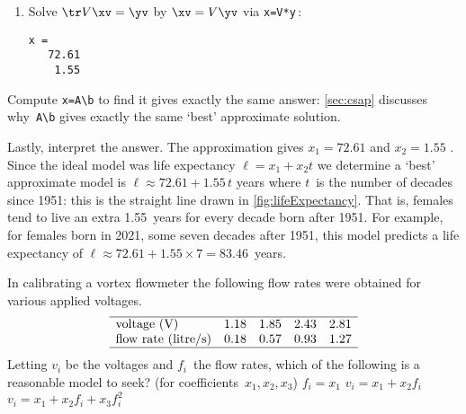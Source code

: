\begin{example}
\begin{solution}
\begin{enumerate}
\item Solve \(\tr V\xv=\yv\) by \(\xv=V\yv\) via \verb|x=V*y|\,:
\begin{verbatim}
x =
   72.61
    1.55
\end{verbatim}
\end{enumerate}
Compute \verb|x=A\b| to find it gives exactly the same answer: \cref{sec:csap} discusses why~\verb|A\b| gives exactly the same `best' approximate solution. 

Lastly, interpret the answer.
The approximation gives \(x_1=72.61\) and \(x_2=1.55\) \twodp.  
Since the ideal model was life expectancy \(\ell=x_1+x_2t\) we  determine a `best' approximate model is \(\ell\approx72.61+1.55\,t\) years where \(t\)~is the number of decades since 1951: this is the straight line drawn in \cref{fig:lifeExpectancy}.
That is, females tend to live an extra 1.55~years for every decade born after 1951.
For example, for females born in 2021, some seven decades after 1951, this model predicts a life expectancy of \(\ell\approx72.61+1.55\times7=83.46\)~years.
\end{solution}
\end{example}



\begin{activity}\label{eg:flowmeter}
In calibrating a vortex flowmeter the following flow rates were obtained for various applied voltages.
\begin{equation*}
\begin{array}{lrrrr}\hline
\text{voltage (V)}&1.18&1.85&2.43&2.81\\
\text{flow rate (litre/s)}&0.18&0.57&0.93&1.27\\\hline
\end{array}
\end{equation*}
Letting \(v_i\) be the voltages and \(f_i\)~the flow rates, which of the following is a reasonable model to seek? (for coefficients~\(x_1,x_2,x_3\))
{\(f_i=x_1\)}
{\(v_i=x_1+x_2f_i\)}
{\(v_i=x_1+x_2f_i+x_3f_i^2\)}
\end{activity}



